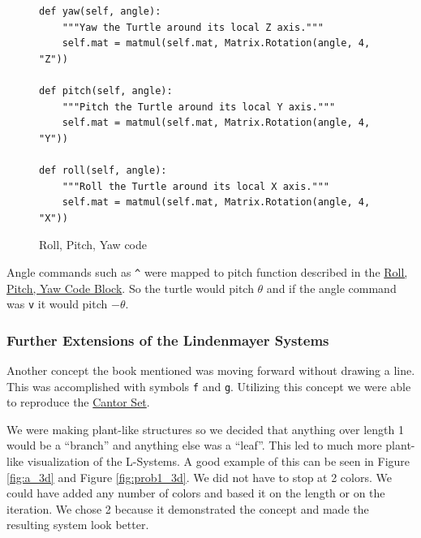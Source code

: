 \begin{figure}
    \begin{verbatim}
def yaw(self, angle):
    """Yaw the Turtle around its local Z axis."""
    self.mat = matmul(self.mat, Matrix.Rotation(angle, 4, "Z"))

def pitch(self, angle):
    """Pitch the Turtle around its local Y axis."""
    self.mat = matmul(self.mat, Matrix.Rotation(angle, 4, "Y"))

def roll(self, angle):
    """Roll the Turtle around its local X axis."""
    self.mat = matmul(self.mat, Matrix.Rotation(angle, 4, "X"))
\end{verbatim}
    \caption*{Roll, Pitch, Yaw code}
    \label{code:roll_pitch_yaw}
\end{figure}

Angle commands such as \texttt{\^} were mapped to pitch function described in
the \hyperref[code:roll_pitch_yaw]{Roll, Pitch, Yaw Code Block}. So the turtle
would pitch $\theta$ and if the angle command was \texttt{v} it would pitch
$-\theta$.




\subsubsection{Further Extensions of the Lindenmayer Systems}
Another concept the book mentioned was moving forward without drawing a line.
This was accomplished with symbols \texttt{f} and \texttt{g}. Utilizing this
concept we were able to reproduce the
\href{https://sketchfab.com/3d-models/cantor-f645d6ae69a748a283a737f44660c5f6}{Cantor Set}.

We were making plant-like structures so we decided that anything over length 1
would be a ``branch'' and anything else was a ``leaf''. This led to much more
plant-like visualization of the L-Systems. A good example of this can be seen
in Figure \ref{fig:a_3d} and Figure \ref{fig:prob1_3d}. We did not have to stop
at 2 colors. We could have added any number of colors and based it on the
length or on the iteration. We chose 2 because it demonstrated the concept and
made the resulting system look better.

